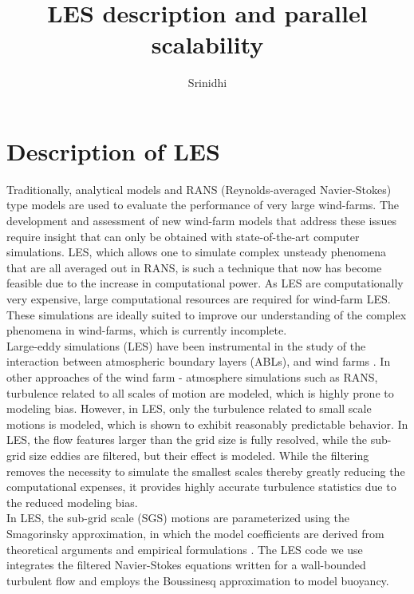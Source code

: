 \documentclass[output=paper,colorlinks,citecolor=brown]{langscibook}
\author{Srinidhi}
\title{LES description and parallel scalability}
\begin{document}
\maketitle

\section{Description of LES}
Traditionally, analytical models and RANS (Reynolds-averaged Navier-Stokes) type models are used to evaluate the performance of very large wind-farms. The development and assessment of new wind-farm models that address these issues require insight that can only be obtained with state-of-the-art computer simulations. LES, which allows one to simulate complex unsteady phenomena that are all averaged out in RANS, is such a technique that now has become feasible due to the increase in computational power. As LES are computationally very expensive, large computational resources are required for wind-farm LES. These simulations are ideally suited to improve our understanding of the complex phenomena in wind-farms, which is currently incomplete.\\ 

Large-eddy simulations (LES) have been instrumental in the study of the interaction between atmospheric boundary layers (ABLs), and wind farms \citep{ste17, por20}. In other approaches of the wind farm - atmosphere simulations such as RANS, turbulence related to all scales of motion are modeled, which is highly prone to modeling bias. However, in LES, only the turbulence related to small scale motions is modeled, which is shown to exhibit reasonably predictable behavior. In LES, the flow features larger than the grid size is fully resolved, while the sub-grid size eddies are filtered, but their effect is modeled. While the filtering removes the necessity to simulate the smallest scales thereby greatly reducing the computational expenses, it provides highly accurate turbulence statistics due to the reduced modeling bias.\\
In LES, the sub-grid scale (SGS) motions are parameterized using the Smagorinsky approximation, in which the model coefficients are derived from theoretical arguments and empirical formulations \citep{sma67}. The LES code we use integrates the filtered Navier-Stokes equations written for a wall-bounded turbulent flow \citep{alb96} and employs the Boussinesq approximation to model buoyancy.\\
\end{document}
